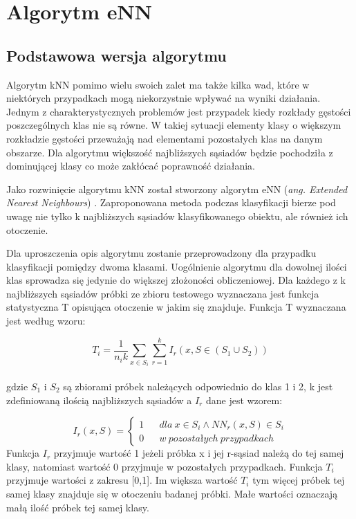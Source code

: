 \chapter{Algorytm eNN}
\label{chap:enn}
\section{Podstawowa wersja algorytmu}
Algorytm kNN pomimo wielu swoich zalet ma także kilka wad, które w niektórych przypadkach mogą niekorzystnie wpływać na wyniki działania. Jednym z charakterystycznych problemów jest przypadek kiedy rozkłady gęstości poszczególnych klas nie są równe. W takiej sytuacji elementy klasy o większym rozkładzie gęstości przeważają nad elementami pozostałych klas na danym obszarze. Dla algorytmu większość najbliższych sąsiadów będzie pochodziła z dominującej klasy co może zakłócać poprawność działania.

Jako rozwinięcie algorytmu kNN został stworzony algorytm eNN (\textit{ang. Extended Nearest Neighbours}) \cite{haibo-he}. Zaproponowana metoda podczas klasyfikacji bierze pod uwagę nie tylko k najbliższych sąsiadów klasyfikowanego obiektu, ale również ich otoczenie. 

Dla uproszczenia opis algorytmu zostanie przeprowadzony dla przypadku klasyfikacji pomiędzy dwoma klasami. Uogólnienie algorytmu dla dowolnej ilości klas sprowadza się jedynie do większej złożoności obliczeniowej. Dla każdego z k najbliższych sąsiadów próbki ze zbioru testowego wyznaczana jest funkcja statystyczna T opisująca otoczenie w jakim się znajduje. Funkcja T wyznaczana jest według wzoru:

\begin{equation}
T_{i} = \frac{1}{n_i k} {\sum_{x \in S_i} \sum_{r=1}^{k} I_r (x,S \in (S_1 \cup S_2))} 
\end{equation}\\
gdzie $S_1$ i $S_2$ są zbiorami próbek należących odpowiednio do klas 1 i 2, k jest zdefiniowaną ilością najbliższych sąsiadów a $I_r$ dane jest wzorem:

\begin{equation}
I_r(x,S) =\left\{\begin{matrix}
1 &&	dla\ x \in S_i \wedge NN_{r}(x,S) \in S_i
\\
0 &&	w\ pozostałych\ przypadkach
\end{matrix}\right.
\end{equation}
Funkcja $I_r$ przyjmuje wartość 1 jeżeli próbka x i jej r-sąsiad należą do tej samej klasy, natomiast wartość 0 przyjmuje w pozostałych przypadkach.
Funkcja $T_i$ przyjmuje wartości z zakresu [0,1]. Im większa wartość $T_i$ tym więcej próbek tej samej klasy znajduje się w otoczeniu badanej próbki. Małe wartości oznaczają małą ilość próbek tej samej klasy.

